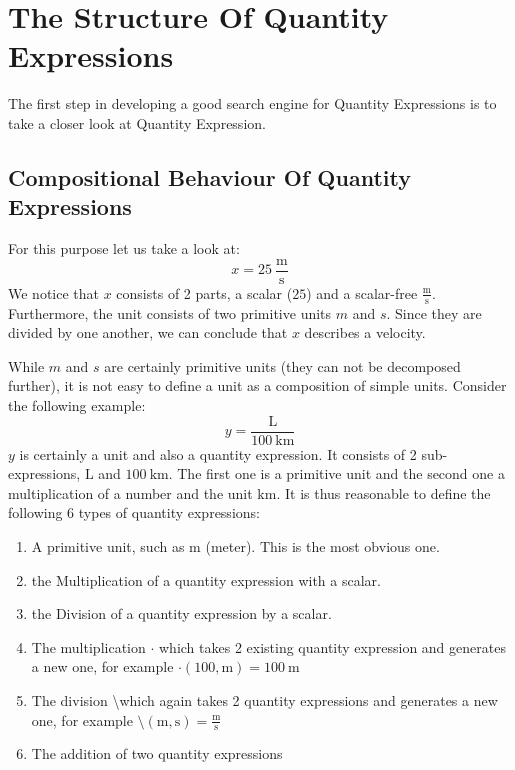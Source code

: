 \section{The Structure Of Quantity Expressions}
\label{sec:strucqe}

The first step in developing a good search engine for Quantity Expressions is to take a closer look at Quantity Expression.

\subsection{Compositional Behaviour Of Quantity Expressions}
For this purpose let us take a look at:
\[x = 25\ \frac{\text{m}}{\text{s}}\]
We notice that $x$ consists of 2 parts, a scalar ($25$) and a scalar-free $\frac{\text{m}}{\text{s}}$. Furthermore, the unit consists of two primitive units $m$ and $s$. Since they are divided by one another, we can conclude that $x$ describes a velocity.

While $m$ and $s$ are certainly primitive units (they can not be decomposed further), it is not easy to define a unit as a composition of simple units. Consider the following example:
\[y = \frac{\text{L}}{100\ \text{km}}\]
$y$ is certainly a unit and also a quantity expression. It consists of 2 sub-expressions, $\text{L}$ and $100\ \text{km}$. The first one is a primitive unit and the second one a multiplication of a number and the unit $\text{km}$. It is thus reasonable to define the following 6 types of quantity expressions:
\begin{enumerate}
  \item A primitive unit, such as $\text{m}$ (meter). This is the most obvious one.
  \item the Multiplication of a quantity expression with a scalar.
  \item the Division of a quantity expression by a scalar.
  \item The multiplication $\cdot{}$ which takes 2 existing quantity expression and generates a new one, for example $\cdot \left(100, \text{m} \right) = 100\ \text{m}$
  \item The division \textbackslash which again takes 2 quantity expressions and generates a new one, for example $\text{\textbackslash} (\text{m}, \text{s}) = \frac{\text{m}}{\text{s}}$
  \item The addition of two quantity expressions
\end{enumerate}

